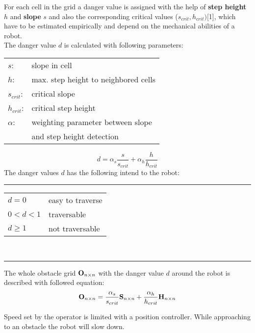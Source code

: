 \documentclass[portrait,final,a0paper,fontscale=0.287]{my_Poster}
\begin{document}
\begin{poster}
{\begin{multicols}{3}
For each cell in the grid a danger value is assigned with the help of \textbf{step height} $h$ and \textbf{slope} $s$ and also the corresponding critical values ($s_{crit}, h_{crit})$[1],  which have to be estimated empirically and depend on the mechanical abilities of a robot.
\vspace{0.5em}\\
The danger value $d$ is calculated with following parameters:\\
	\begin{tabular}{ll}
		$s$: 		& slope in cell\\
		$h$: 		& max. step height to neighbored cells\\
		$s_{crit}$: & critical slope \\
		$h_{crit}$: & critical step height\\
	 	$\alpha$:   & weighting parameter between slope\\
	 	&  and step height detection\\
	\end{tabular}
\begin{equation*}
d = {\alpha}_s \dfrac{s}{s_{crit}} + {\alpha}_h \dfrac{h}{h_{crit}} %
\end{equation*}
The danger values $d$ has the following intend to the robot: 
\vspace{0.5em}
\hrule
	\begin{tabular}{ll}
		$d=0$		& easy to traverse\\
		$0<d<1$		& traversable\\
		$d\ge1$		& not traversable\\
	\end{tabular} \\
	\hrule
	\vspace{0.5em}
The whole obstacle grid $\mathbf{O}_{n \times n}$ with the danger value $d$ around the robot is described with followed equation:
\begin{equation*}
	\mathbf{O}_{n \times n} 
	  = \dfrac{{\alpha}_s}{s_{crit}}  \mathbf{S}_{n \times n} +  
		\dfrac{{\alpha}_h}{h_{crit}}  \mathbf{H}_{n \times n} 
\end{equation*}
 
%  
	Speed set by the operator is limited with a position controller.  While approaching to an obstacle the robot will slow down. 
	

\end{multicols}}
\end{poster}
\end{document}

